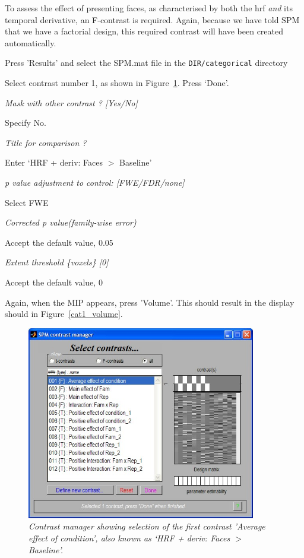 To assess the effect of presenting faces, as characterised by both the hrf {\em and} its temporal derivative, an F-contrast is required. Again, because we have told SPM that we have a factorial design, this required contrast will have been created automatically. 

\bi
\item{Press 'Results' and select the SPM.mat file in the \verb!DIR/categorical! directory}
\item{Select contrast number 1, as shown in Figure~\ref{cat1_contrast}. Press `Done'.}
\item{\em Mask with other contrast ? [Yes/No]}
\item{Specify No.}
\item{\em Title for comparison ?}
\item{Enter `HRF + deriv: Faces $>$ Baseline'}
\item{\em p value adjustment to control: [FWE/FDR/none]}
\item{Select FWE}
\item{\em Corrected p value(family-wise error)}
\item{Accept the default value, 0.05}
\item{\em Extent threshold \{voxels\} [0]}
\item{Accept the default value, 0}
\ei

Again, when the MIP appears, press 'Volume'. This should result in the display should in Figure~\ref{cat1_volume}.

\begin{figure}
\begin{center}
\includegraphics[width=100mm]{faces/cat1_contrast}
\caption{\em Contrast manager showing selection of the first contrast 'Average effect of condition', also known as `HRF + deriv: Faces  $>$ Baseline'. \label{cat1_contrast} }
\end{center}
\end{figure}

